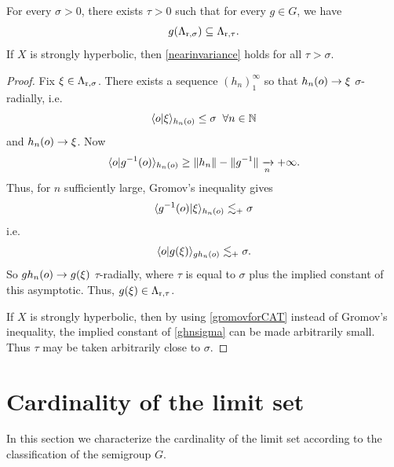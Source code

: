 \begin{proposition}
\label{propositionnearinvariance}
For every $\sigma > 0$, there exists $\tau > 0$ such that for every $g\in G$, we have
\begin{equation}
\label{nearinvariance}
g(\Lambda_{\mathrm r,\sigma}) \subseteq \Lambda_{\mathrm r,\tau}.
\end{equation}
If $X$ is strongly hyperbolic, then \eqref{nearinvariance} holds for all $\tau > \sigma$.
\end{proposition}
\begin{proof}
Fix $\xi\in\Lambda_{\mathrm r,\sigma}$. There exists a sequence $(h_n)_1^\infty$ so that $h_n(o)\to \xi$ $\sigma$-radially, i.e.
\[
\lb \zero|\xi\rb_{h_n(\zero)} \leq \sigma\all n\in\N
\]
and $h_n(o)\to \xi$. Now
\[
\langle o|g^{-1}(o)\rangle_{h_n(o)} \geq \|h_n\| - \|g^{-1}\| \xrightarrow[n]{} +\infty.
\]
Thus, for $n$ sufficiently large, Gromov's inequality gives
\begin{equation}
\label{ghnsigma}
\langle g^{-1}(o)|\xi\rangle_{h_n(o)} \lesssim_+ \sigma
\end{equation}
i.e.
\[
\langle o|g(\xi)\rangle_{gh_n(o)} \lesssim_+ \sigma.
\]
So $gh_n(o)\to g(\xi)$ $\tau$-radially, where $\tau$ is equal to $\sigma$ plus the implied constant of this asymptotic. Thus, $g(\xi)\in\Lambda_{\mathrm r,\tau}$.

If $X$ is strongly hyperbolic, then by using \eqref{gromovforCAT} instead of Gromov's inequality, the implied constant of \eqref{ghnsigma} can be made arbitrarily small. Thus $\tau$ may be taken arbitrarily close to $\sigma$.
\end{proof}

\bigskip
\section{Cardinality of the limit set}

In this section we characterize the cardinality of the limit set according to the classification of the semigroup $G$.


